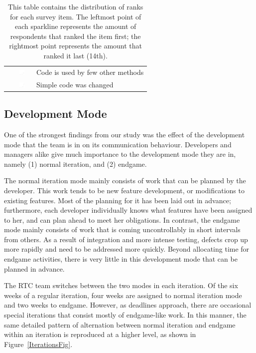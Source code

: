 \begin{table}[t!]
\begin{tabular}{rll}
&\vspace{-2pt}\includegraphics[height=10px, width=30px]{figures/sparkles/code-is-used-by-a-few-other-methods.pdf} & Code is used by few other methods\\ 
&\vspace{-2pt}\includegraphics[height=10px, width=30px]{figures/sparkles/simple-code-was-changed.pdf} & Simple code was changed\\
\bottomrule
\end{tabular}
\vspace{-5pt}
\caption{This table contains the distribution of ranks for each survey item. The leftmost point of each sparkline represents the amount of respondents that ranked the item first; the rightmost point represents the amount that ranked it last (14th).}
\label{tab:sparkle}
\end{table}


\subsection{Development Mode}
One of the strongest findings from our study was the effect of the development mode that the team is in on its communication behaviour. Developers and managers alike give much importance to the development mode they are in, namely (1) normal iteration, and (2) endgame.

The normal iteration mode mainly consists of work that can be planned by the developer. This work tends to be new feature development, or modifications to existing features. Most of the planning for it has been laid out in advance; furthermore, each developer individually knows what features have been assigned to her, and can plan ahead to meet her obligations.
In contrast, the endgame mode mainly consists of work that is coming uncontrollably in short intervals from others. As a result of integration and more intense testing, defects crop up more rapidly and need to be addressed more quickly. Beyond allocating time for endgame activities, there is very little in this development mode that can be planned in advance.

The RTC team switches between the two modes in each iteration. Of the six weeks of a regular iteration, four weeks are assigned to normal iteration mode and two weeks to endgame. However, as deadlines approach, there are occasional special iterations that consist mostly of endgame-like work. In this manner, the same detailed pattern of alternation between normal iteration and endgame within an iteration is reproduced at a higher level, as shown in Figure~\ref{IterationsFig}.

